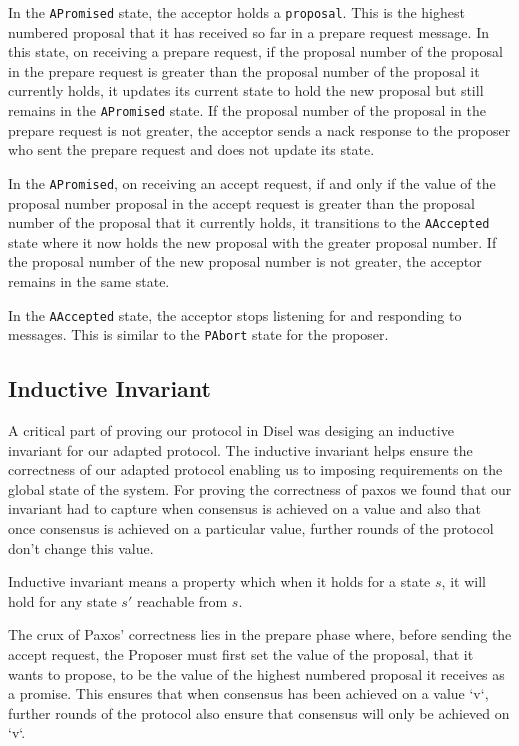 In the \texttt{APromised} state, the acceptor holds a \texttt{proposal}. This is
the highest numbered proposal that it has received so far in a prepare request
message. In this state, on receiving a prepare request, if the proposal number
of the proposal in the prepare request is greater than the proposal number of
the proposal it currently holds, it updates its current state to hold the new
proposal but still remains in the \texttt{APromised} state. If the proposal
number of the proposal in the prepare request is not greater, the acceptor
sends a nack response to the proposer who sent the prepare request and does not
update its state.

In the \texttt{APromised}, on receiving an accept request, if and only if
the value of the proposal number proposal in the accept request is greater than
the proposal number of the proposal that it currently holds, it transitions to the
\texttt{AAccepted} state where it now holds the new proposal with the greater
proposal number. If the proposal number of the new proposal number is not greater,
the acceptor remains in the same state.

In the \texttt{AAccepted} state, the acceptor stops listening for and responding
to messages. This is similar to the \texttt{PAbort} state for the proposer.


\subsection{Inductive Invariant}
A critical part of proving our protocol in Disel was desiging an inductive invariant
for our adapted protocol. The inductive invariant helps ensure the correctness of
our adapted protocol enabling us to imposing requirements on the global state of the system.
For proving the correctness of paxos we found that our invariant had to capture
when consensus is achieved on a value and also that once consensus is achieved
on a particular value, further rounds of the protocol don’t change this value.

Inductive invariant means a property which when it holds for a state $s$,
it will hold for any state $s'$ reachable from $s$.

The crux of Paxos' correctness lies in the prepare phase where, before sending
the accept request, the Proposer must first set the value of the proposal, that
it wants to propose, to be the value of the highest numbered proposal it receives
as a promise. This ensures that when consensus has been achieved on a value `v`,
further rounds of the protocol also ensure that consensus will only be achieved on `v`.

